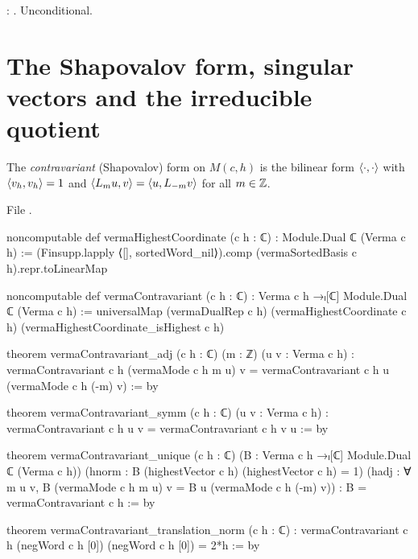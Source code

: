 \begin{status}
\allowbreak{}\allowbreak{}\allowbreak{}\allowbreak{}: \lean{[propext, Classical.}\allowbreak{}\allowbreak\lean{sound]}.
Unconditional.
\end{status}

\section{The Shapovalov form, singular vectors and the irreducible quotient}\label{l06:sec:shap}

\begin{definition}\label{l06:def:shap}
The \emph{contravariant} (Shapovalov) form on $M(c,h)$ is the bilinear form $\langle \cdot,\cdot\rangle$ with
$\langle v_h,v_h\rangle = 1$ and $\langle L_mu,v\rangle = \langle u,L_{-m}v\rangle$ for all $m\in{\mathbb{Z}}$.
\end{definition}

File .
\begin{leancode}
noncomputable def vermaHighestCoordinate (c h : ℂ) : Module.Dual ℂ (Verma c h) :=
  (Finsupp.lapply ⟨[], sortedWord_nil⟩).comp (vermaSortedBasis c h).repr.toLinearMap

noncomputable def vermaContravariant (c h : ℂ) :
    Verma c h →ₗ[ℂ] Module.Dual ℂ (Verma c h) :=
  universalMap (vermaDualRep c h) (vermaHighestCoordinate c h)
    (vermaHighestCoordinate_isHighest c h)

theorem vermaContravariant_adj (c h : ℂ) (m : ℤ) (u v : Verma c h) :
    vermaContravariant c h (vermaMode c h m u) v =
      vermaContravariant c h u (vermaMode c h (-m) v) := by

theorem vermaContravariant_symm (c h : ℂ) (u v : Verma c h) :
    vermaContravariant c h u v = vermaContravariant c h v u := by

theorem vermaContravariant_unique (c h : ℂ)
    (B : Verma c h →ₗ[ℂ] Module.Dual ℂ (Verma c h))
    (hnorm : B (highestVector c h) (highestVector c h) = 1)
    (hadj : ∀ m u v, B (vermaMode c h m u) v = B u (vermaMode c h (-m) v)) :
    B = vermaContravariant c h := by

theorem vermaContravariant_translation_norm (c h : ℂ) :
    vermaContravariant c h (negWord c h [0]) (negWord c h [0]) = 2*h := by
\end{leancode}

